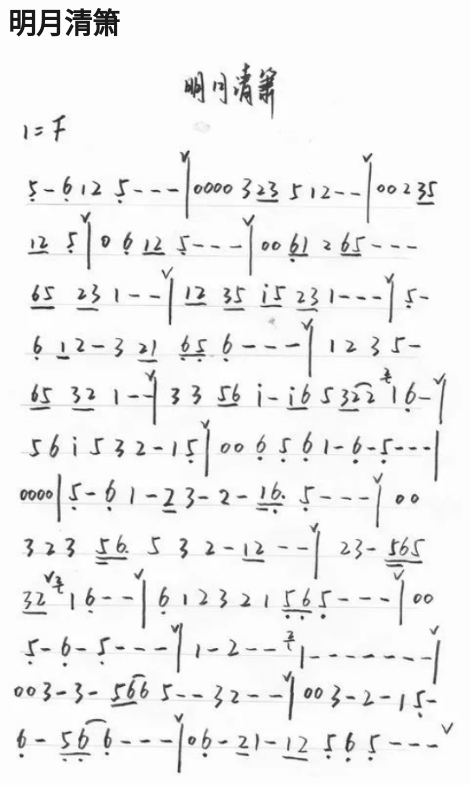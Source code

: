 \documentclass[cn,pad,twocol]{elegantbook}
\begin{document}
\section{明月清箫}\includegraphics[width=0.9\textwidth]{dongxiao/20200819/明月清箫.png}
\end{document}
